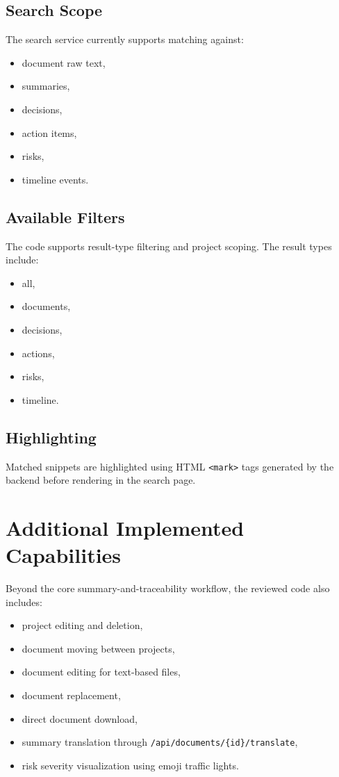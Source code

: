 \documentclass[12pt, a4paper]{article}
\begin{document}
\subsection{Search Scope}
The search service currently supports matching against:
\begin{itemize}
\item document raw text,
\item summaries,
\item decisions,
\item action items,
\item risks,
\item timeline events.
\end{itemize}

\subsection{Available Filters}
The code supports result-type filtering and project scoping. The result types include:
\begin{itemize}
\item all,
\item documents,
\item decisions,
\item actions,
\item risks,
\item timeline.
\end{itemize}

\subsection{Highlighting}
Matched snippets are highlighted using HTML \texttt{<mark>} tags generated by the backend before rendering in the search page.

\section{Additional Implemented Capabilities}
Beyond the core summary-and-traceability workflow, the reviewed code also includes:
\begin{itemize}
\item project editing and deletion,
\item document moving between projects,
\item document editing for text-based files,
\item document replacement,
\item direct document download,
\item summary translation through \texttt{/api/documents/\{id\}/translate},
\item risk severity visualization using emoji traffic lights.
\end{itemize}
\end{document}
